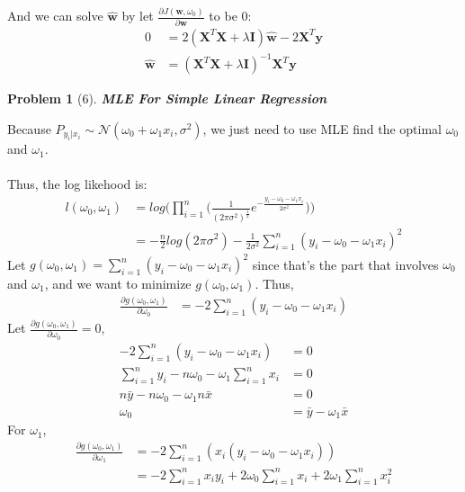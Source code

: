 \documentclass[11pt]{article}
\theoremstyle{quest}
\newtheorem*{question}{Problem}
\begin{document}
And we can solve $\hat{\textbf{w}}$ by let $\frac{\partial J(\textbf{w}, \omega_0)}{\partial \textbf{w}}$ to be 0:
\begin{align*}
0 &= 2(\textbf{X}^{T}\textbf{X} + \lambda\textbf{I})\hat{\textbf{w}} - 2\textbf{X}^{T}\textbf{y}\\
\hat{\textbf{w}} &= (\textbf{X}^{T}\textbf{X} + \lambda\textbf{I})^{-1}\textbf{X}^{T}\textbf{y}
\end{align*}
\newpage

\begin{question}[6]
\textbf{MLE For Simple Linear Regression}
\end{question}
Because $P_{y_i|x_i}\sim\mathcal{N}(\omega_0 + \omega_{1}x_i, \sigma^2)$, we just need to use MLE find the optimal $\omega_0$ and $\omega_1$.
\\\\
Thus, the log likehood is:
\begin{align*}
l(\omega_0, \omega_1) &= log \Bigg(\prod_{i=1}^{n}\Bigg(\frac{1}{(2\pi\sigma^2)^{\frac{1}{2}}}e^{-\frac{y_i - \omega_0 - \omega_1 x_i}{2\sigma^2}}\Bigg)\Bigg)\\
&= -\frac{n}{2}log(2\pi\sigma^2) - \frac{1}{2\sigma^2}\sum_{i=1}^{n}(y_i - \omega_0 - \omega_1 x_i)^2
\end{align*}
Let $g(\omega_0, \omega_1) = \sum_{i=1}^{n}(y_i - \omega_0 - \omega_1 x_i)^2$ since that's the part that involves $\omega_0$ and $\omega_1$, and we want to minimize $g(\omega_0, \omega_1)$.
Thus,
\begin{align*}
\frac{\partial g(\omega_0, \omega_1)}{\partial \omega_0} &= -2\sum_{i=1}^{n}(y_i - \omega_0 - \omega_1 x_i)
\end{align*}
Let $\frac{\partial g(\omega_0, \omega_1)}{\partial \omega_0} = 0$,
\begin{align*}
-2\sum_{i=1}^{n}(y_i - \omega_0 - \omega_1 x_i) &= 0\\
\sum_{i=1}^{n}y_i - n\omega_0 - \omega_1 \sum_{i=1}^{n}x_i &= 0\\
n\bar{y} - n\omega_0 - \omega_{1}n\bar{x} &= 0 \\
\omega_0 &= \bar{y} - \omega_{1}\bar{x}
\end{align*}
For $\omega_1$,
\begin{align*}
\frac{\partial g(\omega_0, \omega_1)}{\partial \omega_1} &= -2\sum_{i=1}^{n}(x_i(y_i - \omega_0 - \omega_1 x_i))\\
&= -2 \sum_{i=1}^{n}x_{i}y_{i} + 2\omega_{0}\sum_{i=1}^{n}x_{i} + 2\omega_{1}\sum_{i=1}^{n}x_{i}^{2}
\end{align*}
\end{document}
